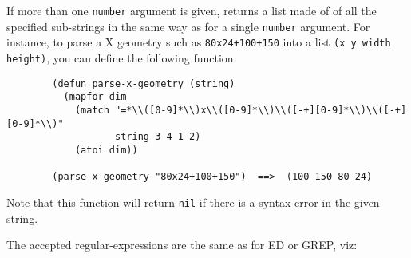 If more than one \verb"number" argument is given, returns a list made of
of all the specified sub-strings in the same way as for a single \verb"number"
argument. For instance, to parse a X geometry such as \verb"80x24+100+150"
into a list \verb"(x y width height)", you can define the following function:

{\exemplefont\begin{verbatim}
        (defun parse-x-geometry (string)
          (mapfor dim                   
            (match "=*\\([0-9]*\\)x\\([0-9]*\\)\\([-+][0-9]*\\)\\([-+][0-9]*\\)" 
                   string 3 4 1 2)
            (atoi dim))
        
        (parse-x-geometry "80x24+100+150")  ==>  (100 150 80 24)
\end{verbatim}}

Note that this function will return \verb"nil" if there is a syntax error in
the given string.

The accepted regular-expressions are the same as for ED or GREP, viz:

